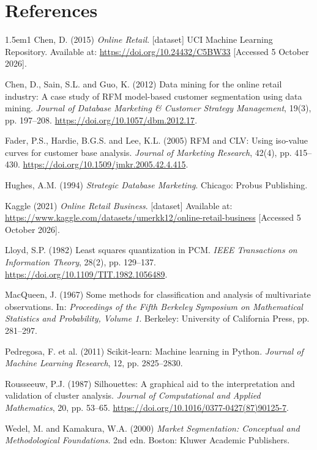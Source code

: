 \documentclass[11pt,a4paper]{article}
\begin{document}
\section*{References}
\begin{hangparas}{1.5em}{1}
Chen, D. (2015) \textit{Online Retail}. [dataset] UCI Machine Learning Repository. Available at: \url{https://doi.org/10.24432/C5BW33} [Accessed 5 October 2026].

Chen, D., Sain, S.L. and Guo, K. (2012) Data mining for the online retail industry: A case study of RFM model-based customer segmentation using data mining. \textit{Journal of Database Marketing \& Customer Strategy Management}, 19(3), pp. 197--208. \url{https://doi.org/10.1057/dbm.2012.17}.

Fader, P.S., Hardie, B.G.S. and Lee, K.L. (2005) RFM and CLV: Using iso-value curves for customer base analysis. \textit{Journal of Marketing Research}, 42(4), pp. 415--430. \url{https://doi.org/10.1509/jmkr.2005.42.4.415}.

Hughes, A.M. (1994) \textit{Strategic Database Marketing}. Chicago: Probus Publishing.

Kaggle (2021) \textit{Online Retail Business}. [dataset] Available at: \url{https://www.kaggle.com/datasets/umerkk12/online-retail-business} [Accessed 5 October 2026].

Lloyd, S.P. (1982) Least squares quantization in PCM. \textit{IEEE Transactions on Information Theory}, 28(2), pp. 129--137. \url{https://doi.org/10.1109/TIT.1982.1056489}.

MacQueen, J. (1967) Some methods for classification and analysis of multivariate observations. In: \textit{Proceedings of the Fifth Berkeley Symposium on Mathematical Statistics and Probability, Volume 1}. Berkeley: University of California Press, pp. 281--297.

Pedregosa, F. et al. (2011) Scikit-learn: Machine learning in Python. \textit{Journal of Machine Learning Research}, 12, pp. 2825--2830.

Rousseeuw, P.J. (1987) Silhouettes: A graphical aid to the interpretation and validation of cluster analysis. \textit{Journal of Computational and Applied Mathematics}, 20, pp. 53--65. \url{https://doi.org/10.1016/0377-0427(87)90125-7}.

Wedel, M. and Kamakura, W.A. (2000) \textit{Market Segmentation: Conceptual and Methodological Foundations}. 2nd edn. Boston: Kluwer Academic Publishers.
\end{hangparas}
\end{document}
